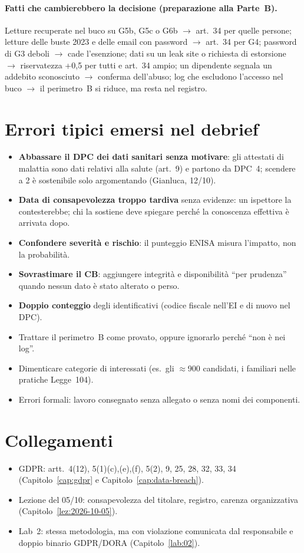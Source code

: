 \paragraph{Fatti che cambierebbero la decisione (preparazione alla Parte~B).} Letture recuperate nel
buco su G5b, G5c o G6b $\rightarrow$ art.~34 per quelle persone; letture delle buste 2023 e delle
email con password $\rightarrow$ art.~34 per G4; password di G3 deboli $\rightarrow$ cade l'esenzione;
dati su un leak site o richiesta di estorsione $\rightarrow$ riservatezza +0,5 per tutti e art.~34
ampio; un dipendente segnala un addebito sconosciuto $\rightarrow$ conferma dell'abuso; log che
escludono l'accesso nel buco $\rightarrow$ il perimetro~B si riduce, ma resta nel registro.

\section{Errori tipici emersi nel debrief}
\begin{itemize}
  \item \textbf{Abbassare il DPC dei dati sanitari senza motivare}: gli attestati di malattia sono
    dati relativi alla salute (art.~9) e partono da DPC~4; scendere a 2 è sostenibile solo
    argomentando (Gianluca, 12/10).
  \item \textbf{Data di consapevolezza troppo tardiva} senza evidenze: un ispettore la contesterebbe;
    chi la sostiene deve spiegare perché la conoscenza effettiva è arrivata dopo.
  \item \textbf{Confondere severità e rischio}: il punteggio ENISA misura l'impatto, non la
    probabilità.
  \item \textbf{Sovrastimare il CB}: aggiungere integrità e disponibilità ``per prudenza'' quando
    nessun dato è stato alterato o perso.
  \item \textbf{Doppio conteggio} degli identificativi (codice fiscale nell'EI e di nuovo nel DPC).
  \item Trattare il perimetro~B come provato, oppure ignorarlo perché ``non è nei log''.
  \item Dimenticare categorie di interessati (es.\ gli $\approx$900 candidati, i familiari nelle pratiche
    Legge~104).
  \item Errori formali: lavoro consegnato senza allegato o senza nomi dei componenti.
\end{itemize}

\section{Collegamenti}
\begin{itemize}
  \item GDPR: artt.~4(12), 5(1)(c),(e),(f), 5(2), 9, 25, 28, 32, 33, 34 (Capitolo~\ref{cap:gdpr} e
    Capitolo~\ref{cap:data-breach}).
  \item Lezione del 05/10: consapevolezza del titolare, registro, carenza organizzativa
    (Capitolo~\ref{lez:2026-10-05}).
  \item Lab~2: stessa metodologia, ma con violazione comunicata dal responsabile e doppio binario
    GDPR/DORA (Capitolo~\ref{lab:02}).
\end{itemize}


